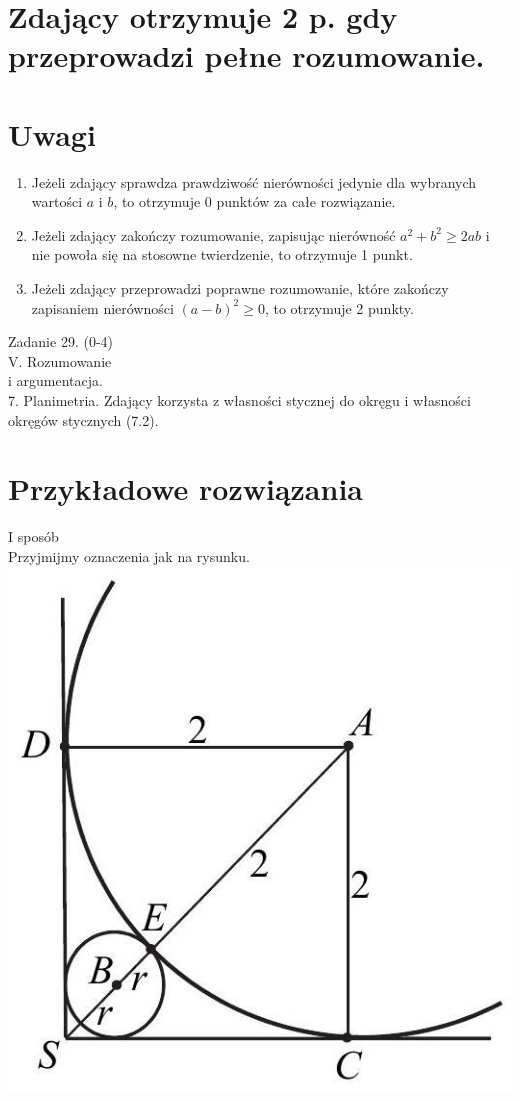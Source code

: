 \documentclass[10pt]{article}
\begin{document}
\section*{Zdający otrzymuje 2 p. gdy przeprowadzi pełne rozumowanie.}
\section*{Uwagi}
\begin{enumerate}
  \item Jeżeli zdający sprawdza prawdziwość nierówności jedynie dla wybranych wartości $a$ i $b$, to otrzymuje 0 punktów za całe rozwiązanie.
  \item Jeżeli zdający zakończy rozumowanie, zapisując nierówność $a^{2}+b^{2} \geq 2 a b$ i nie powoła się na stosowne twierdzenie, to otrzymuje 1 punkt.
  \item Jeżeli zdający przeprowadzi poprawne rozumowanie, które zakończy zapisaniem nierówności $(a-b)^{2} \geq 0$, to otrzymuje 2 punkty.
\end{enumerate}

Zadanie 29. (0-4)\\
V. Rozumowanie\\
i argumentacja.\\
7. Planimetria. Zdający korzysta z własności stycznej do okręgu i własności okręgów stycznych (7.2).

\section*{Przykładowe rozwiązania}
I sposób\\
Przyjmijmy oznaczenia jak na rysunku.\\
\includegraphics[max width=\textwidth, center]{2025_02_07_a74eed68a1a2147a06fdg-10}
\end{document}
